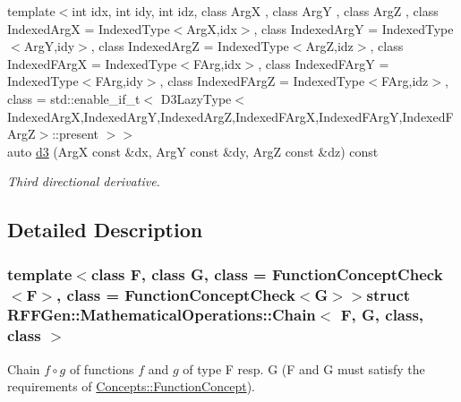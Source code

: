 \begin{DoxyCompactItemize}
{\footnotesize template$<$int idx, int idy, int idz, class Arg\-X , class Arg\-Y , class Arg\-Z , class Indexed\-Arg\-X  = Indexed\-Type$<$\-Arg\-X,idx$>$, class Indexed\-Arg\-Y  = Indexed\-Type$<$\-Arg\-Y,idy$>$, class Indexed\-Arg\-Z  = Indexed\-Type$<$\-Arg\-Z,idz$>$, class Indexed\-F\-Arg\-X  = Indexed\-Type$<$\-F\-Arg,idx$>$, class Indexed\-F\-Arg\-Y  = Indexed\-Type$<$\-F\-Arg,idy$>$, class Indexed\-F\-Arg\-Z  = Indexed\-Type$<$\-F\-Arg,idz$>$, class  = std\-::enable\-\_\-if\-\_\-t$<$ D3\-Lazy\-Type$<$\-Indexed\-Arg\-X,\-Indexed\-Arg\-Y,\-Indexed\-Arg\-Z,\-Indexed\-F\-Arg\-X,\-Indexed\-F\-Arg\-Y,\-Indexed\-F\-Arg\-Z$>$\-::present $>$$>$ }\\auto \hyperlink{structRFFGen_1_1MathematicalOperations_1_1Chain_a9c99a40bc32fe065acd3144f3d6a4ce7}{d3} (Arg\-X const \&dx, Arg\-Y const \&dy, Arg\-Z const \&dz) const 
\begin{DoxyCompactList}\small\item\em Third directional derivative. \end{DoxyCompactList}\end{DoxyCompactItemize}


\subsection{Detailed Description}
\subsubsection*{template$<$class F, class G, class = Function\-Concept\-Check$<$\-F$>$, class = Function\-Concept\-Check$<$\-G$>$$>$struct R\-F\-F\-Gen\-::\-Mathematical\-Operations\-::\-Chain$<$ F, G, class, class $>$}

Chain $ f\circ g $ of functions $f$ and $g$ of type F resp. G (F and G must satisfy the requirements of \hyperlink{structRFFGen_1_1Concepts_1_1FunctionConcept}{Concepts\-::\-Function\-Concept}). 

